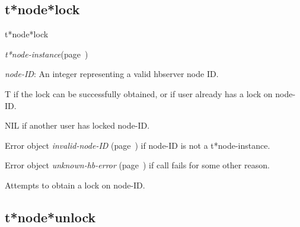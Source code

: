 \subsection{t*node*lock}
\label{t*node*lock}

\begin{description}
\item [Name:]  t*node*lock

\item [Class:] {\sl t*node-instance}\hfill(page~\pageref{t*node-instance})

\item [Parameters:]
\item {\sl node-ID}:   An integer representing
a valid hbserver node ID.


\item [Return-value:]
T if the lock can be successfully obtained, or if
user already has a lock on node-ID.

NIL if another user has locked node-ID.

Error object {\sl invalid-node-ID} (page~\pageref{invalid-node-ID}) if node-ID is
not a t*node-instance.

Error object {\sl unknown-hb-error} (page~\pageref{unknown-hb-error}) if call fails
for some other reason.

\item [Description:]

Attempts to obtain a lock on node-ID. 

\item [Public:]



\end{description}
\horizontalline

\subsection{t*node*unlock}
\label{t*node*unlock}

